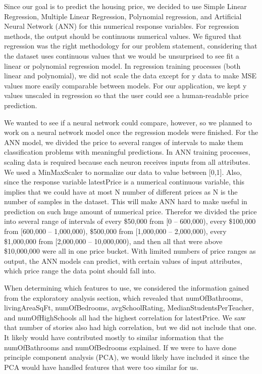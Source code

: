 \documentclass[a4paper]{article}
\begin{document}
	Since our goal is to predict the housing price, we decided to use Simple Linear Regression, Multiple Linear Regression, Polynomial regression, and Artificial Neural Network (ANN) for this numerical response variables. For regression methods, the output should be continuous numerical values. We figured that regression was the right methodology for our problem statement, considering that the dataset uses continuous values that we would be unsurprised to see fit a linear or polynomial regression model. In regression training processes (both linear and polynomial), we did not scale the data except for y data to make MSE values more easily comparable between models. For our application, we kept y values unscaled in regression so that the user could see a human-readable price prediction.
	
	We wanted to see if a neural network could compare, however, so we planned to work on a neural network model once the regression models were finished. For the ANN model, we divided the price to several ranges of intervals to make them classification problems with meaningful predictions. In ANN training processes, scaling data is required because each neuron receives inputs from all attributes. We used a MinMaxScaler to normalize our data to value between [0,1]. Also, since the response variable latestPrice is a numerical continuous variable, this implies that we could have at most N number of different prices as N is the number of samples in the dataset. This will make ANN hard to make useful in prediction on such huge amount of numerical price. Therefor we divided the price into several range of intervals of every \$50,000 from [0 – 600,000), every \$100,000 from [600,000 – 1,000,000), \$500,000 from [1,000,000 – 2,000,000), every \$1,000,000 from [2,000,000 – 10,000,000), and then all that were above \$10,000,000 were all in one price bucket. With limited numbers of price ranges as output, the ANN models can predict, with certain values of input attributes, which price range the data point should fall into.
	
	When determining which features to use, we considered the information gained from the exploratory analysis section, which revealed that numOfBathrooms, livingAreaSqFt, numOfBedrooms, avgSchoolRating, MedianStudentsPerTeacher, and numOfHighSchools all had the highest correlation for latestPrice. We saw that number of stories also had high correlation, but we did not include that one. It likely would have contributed mostly to similar information that the numOfBathrooms and numOfBedrooms explained. If we were to have done principle component analysis (PCA), we would likely have included it since the PCA would have handled features that were too similar for us.
	
\end{document}

